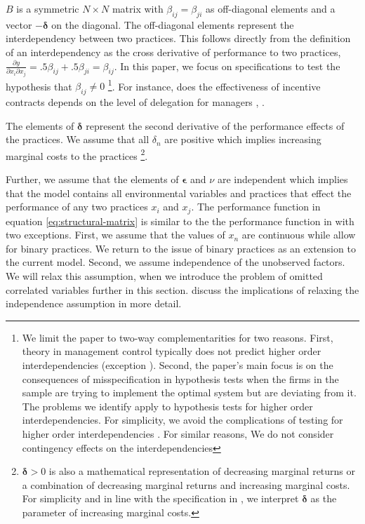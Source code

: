 \documentclass[12pt]{article}
\begin{document}
$B$ is a symmetric $N \times N$ matrix with $\beta_{ij} = \beta_{ji}$ as off-diagonal elements and a vector $-\mathbf{\delta}$ on the diagonal. The off-diagonal elements represent the interdependency between two practices. This follows directly from the definition of an interdependency as the cross derivative of performance to two practices, $\frac{\partial y}{\partial x_i \partial x_j} = .5 \beta_{ij} + .5 \beta_{ji} = \beta_{ij}$. In this paper, we focus on specifications to test the hypothesis that $\beta_{ij} \neq 0$ \footnote{We limit the paper to two-way complementarities for two reasons. First, theory in management control typically does not predict higher order interdependencies (exception \citet{Aral2012}). Second, the paper's main focus is on the consequences of misspecification in hypothesis tests when the firms in the sample are trying to implement the optimal system but are deviating from it. The problems we identify apply to hypothesis tests for higher order interdependencies. For simplicity, we avoid the complications of testing for higher order interdependencies \citep{Carree2011}. For similar reasons, We do not consider contingency effects on the interdependencies}. For instance, does the effectiveness of incentive contracts depends on the level of delegation for managers \citep{Moers2006}, .  

The elements of $\mathbf{\delta}$ represent the second derivative of the performance effects of the practices. We assume that all $\delta_n$ are positive which implies increasing marginal costs to the practices  \footnote{$\mathbf{\delta} > 0$ is also a mathematical representation of decreasing marginal returns or a combination of decreasing marginal returns and increasing marginal  costs. For simplicity and in line with the specification in \citet{Grabner2013}, we interpret $\mathbf{\delta}$ as the parameter of  increasing marginal costs.}. 

Further, we assume that the elements of $\mathbf{\epsilon}$ and $\nu$ are independent which implies that the model contains all environmental variables and practices that effect the performance of any two practices $x_i$ and $x_j$. The performance function in equation \eqref{eq:structural-matrix} is similar to the the performance function in \citet{Kretschmer2012} with two exceptions. First, we assume that the values of $x_n$ are continuous while \citet{Kretschmer2012} allow for binary practices. We return to the issue of binary practices as an extension to the current model. Second, we assume independence of the unobserved factors. We will relax this assumption, when we introduce the problem of omitted correlated variables further in this section. \citet{Athey1998} discuss the implications of relaxing the independence assumption in more detail. 
\end{document}
